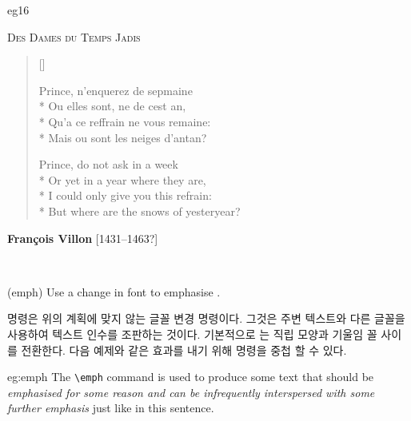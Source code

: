 \begin{egresult}{eg16}
\begin{center}
\textsc{Des Dames du Temps Jadis}
\end{center}%
\settowidth{\versewidth}{Or yet in a year where they are}
\begin{verse}[\versewidth] \begin{itshape}
Prince, n'enquerez de sepmaine \\* 
Ou elles sont, ne de cest an, \\*
Qu'a ce reffrain ne vous remaine: \\*
Mais ou sont les neiges d'antan?
\end{itshape}

Prince, do not ask in a week \\* 
Or yet in a year where they are, \\*
I could only give you this refrain: \\*
But where are the snows of yesteryear?
\end{verse}
\begin{flushright}
{\bfseries Fran\c{c}ois Villon} [1431--1463?]
\end{flushright}
\end{egresult}

\begin{syntax}
\cmd{\emph} \\
\end{syntax}
\glossary(emph)%
  {}%
  {Use a change in font to emphasise .}

\cmd{\emph} 명령은 위의 계획에 맞지 않는 글꼴 변경 명령이다. 
그것은 주변 텍스트와 다른 글꼴을 사용하여 텍스트 인수를 조판하는 것이다. 기본적으로 \cmd{\emph}는 직립 모양과 기울임 꼴 사이를 전환한다.
다음 예제와 같은 효과를 내기 위해 명령을 중첩 할 수 있다.

\begin{egsource}{eg:emph}
The \verb?\emph? command is used to produce some text that 
should be \emph{emphasised for some reason and can be
\emph{infrequently interspersed} with some further emphasis} 
just like in this sentence.
\end{egsource}
 
